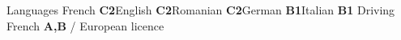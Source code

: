 
\begin{cvskills}[0.9]
	\cvskill
	{Languages}
	{French \textbf{C2}\allowbreak\hspace{0.6em}English \textbf{C2}\allowbreak\hspace{0.6em}Romanian \textbf{C2}\allowbreak\hspace{0.6em}German \textbf{B1}\allowbreak\hspace{0.6em}Italian \textbf{B1}}
	\cvskill
	{Driving}
	{French \textbf{A,B} / European licence}
\end{cvskills}
